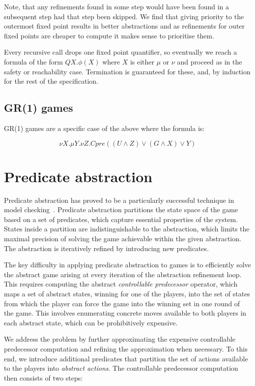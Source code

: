 Note, that any refinements found in some step would have been found in a subsequent step had that step been skipped. We find that giving priority to the outermost fixed point results in better abstractions and as refinements for outer fixed points are cheaper to compute it makes sense to prioritise them.

Every recursive call drops one fixed point quantifier, so eventually we reach a formula of the form $Q X. \phi(X)$ where $X$ is either $\mu$ or $\nu$ and proceed as in the safety or reachability case. Termination is guaranteed for these, and, by induction for the rest of the specification.

\subsection{GR(1) games}

GR(1) games are a specific case of the above where the formula is:

\begin{equation}
    \nu X. \mu Y. \nu Z. Cpre((U \wedge Z) \vee (G \wedge X) \vee Y)
\end{equation}

\section{Predicate abstraction}

Predicate abstraction has proved to be a particularly successful technique in model checking~\cite{Graf_Saidi_97}. Predicate abstraction partitions the state space of the game based on a set of predicates, which capture essential properties of the system. States inside a partition are indistinguishable to the abstraction, which limits the maximal precision of solving the game achievable within the given abstraction. The abstraction is iteratively refined by introducing new predicates.

The key difficulty in applying predicate abstraction to games is to efficiently solve the abstract game arising at every iteration of the abstraction refinement loop. This requires computing the abstract \emph{controllable predecessor} operator, which maps a set of abstract states, winning for one of the players, into the set of states from which the player can force the game into the winning set in one round of the game. This involves enumerating concrete moves available to both players in each abstract state, which can be prohibitively expensive.  

We address the problem by further approximating the expensive controllable predecessor computation and refining the approximation when necessary. To this end, we introduce additional predicates that partition the set of actions available to the players into \emph{abstract actions}. The controllable predecessor computation then consists of two steps: 

